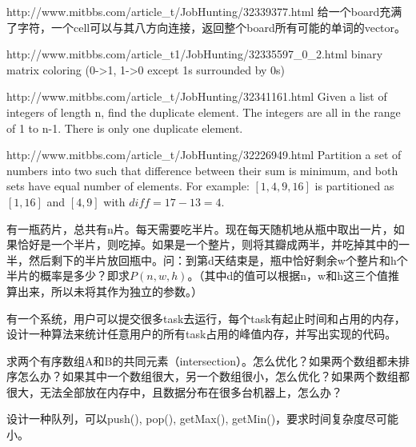 \documentclass[a4paper]{article}
\begin{document}
\begin{CJK}{UTF8}{gbsn}
\begin{enumerate}
\begin{Q}[Google]{http://www.mitbbs.com/article_t/JobHunting/32339377.html}
给一个board充满了字符，一个cell可以与其八方向连接，返回整个board所有可能的单词的vector。
\end{Q}

\begin{Q}[Google]{http://www.mitbbs.com/article_t1/JobHunting/32335597_0_2.html}
binary matrix coloring (0->1, 1->0 except 1s surrounded by 0s)
\end{Q}

\begin{Q}[Amazon]{http://www.mitbbs.com/article_t/JobHunting/32341161.html}
Given a list of integers of length n, find the duplicate element. The integers are all in the range of 1 to n-1. There is only one duplicate element.
\end{Q}

\begin{Q}[Google]{http://www.mitbbs.com/article_t/JobHunting/32226949.html}
Partition a set of numbers into two such that difference between their sum is minimum, and both sets have equal number of elements. For example: $[1, 4, 9, 16]$ is partitioned as $[1,16]$ and $[4,9]$ with $diff = 17-13=4$.
\end{Q}

\begin{Q}[Google]{}
有一瓶药片，总共有n片。每天需要吃半片。现在每天随机地从瓶中取出一片，如果恰好是一个半片，则吃掉。如果是一个整片，则将其瓣成两半，并吃掉其中的一半，然后剩下的半片放回瓶中。问：到第d天结束是，瓶中恰好剩余w个整片和h个半片的概率是多少？即求$P(n, w, h)$。（其中d的值可以根据n，w和h这三个值推算出来，所以未将其作为独立的参数。）
\end{Q}

\begin{Q}[Google]{}
有一个系统，用户可以提交很多task去运行，每个task有起止时间和占用的内存，设计一种算法来统计任意用户的所有task占用的峰值内存，并写出实现的代码。
\end{Q}

\begin{Q}[Google]{}
求两个有序数组A和B的共同元素（intersection）。怎么优化？如果两个数组都未排序怎么办？如果其中一个数组很大，另一个数组很小，怎么优化？如果两个数组都很大，无法全部放在内存中，且数据分布在很多台机器上，怎么办？
\end{Q}

\begin{Q}[Google]{}
设计一种队列，可以push(), pop(), getMax(), getMin()，要求时间复杂度尽可能小。
\end{Q}


\end{enumerate}
\end{CJK}
\end{document}
